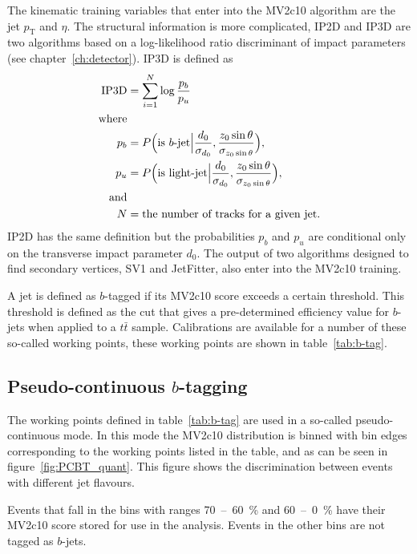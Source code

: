 The kinematic training variables that enter into the MV2c10 algorithm are
the jet $p_{\mathrm{T}}$ and $\eta$. The structural information is more complicated, IP2D
and IP3D are two algorithms based on a log-likelihood ratio discriminant of
impact parameters (see chapter~\ref{ch:detector}). IP3D is defined as
\begin{align}
  \text{IP3D} &=\sum_{i=1}^{N}\log{\frac{p_b}{p_u}} \\
  \text{where}& \notag \\
  p_b &= P\Big(\text{is }b\text{-jet} \Big\vert \frac{d_0}{\sigma_{d_0}},
        \frac{z_0 \sin{\theta}}{\sigma_{z_0\sin{\theta}}}\Big),\\
  p_u &= P\Big(\text{is light-jet} \Big\vert \frac{d_0}{\sigma_{d_0}},
        \frac{z_0 \sin{\theta}}{\sigma_{z_0\sin{\theta}}}\Big),\\
  \text{and} & \notag \\
  N &= \text{the number of tracks for a given jet.} \notag
\end{align}
IP2D has the same definition but the probabilities $p_b$ and $p_u$ are
conditional only on the transverse impact parameter $d_0$. The output of two
algorithms designed to find secondary vertices, SV1 and JetFitter, also enter
into the MV2c10 training.

A jet is defined as $b$-tagged if its MV2c10 score exceeds a certain threshold. This
threshold is defined as the cut that gives a pre-determined efficiency value for
$b$-jets when applied to a $t\bar{t}$ sample. Calibrations are available for a
number of these so-called working points, these working points are shown in
table~\ref{tab:b-tag}.


\subsection{Pseudo-continuous $b$-tagging}
The working points defined in table~\ref{tab:b-tag} are used in a so-called
pseudo-continuous mode. In this mode the MV2c10 distribution is binned with bin
edges corresponding to the working points listed in the table, and as can be
seen in figure~\ref{fig:PCBT_quant}. This figure shows the discrimination between
events with different jet flavours. 

Events that fall in the bins with ranges 70~--~60~\% and 60~--~0~\% have their
MV2c10 score stored for use in the analysis. Events in the other bins are not
tagged as $b$-jets.

